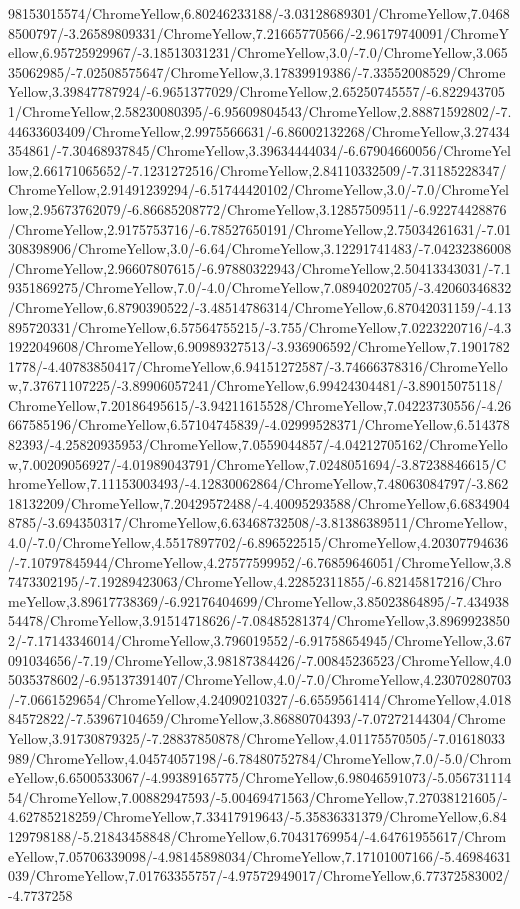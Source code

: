 {\begin{tikzternal}
98153015574/ChromeYellow,6.80246233188/-3.03128689301/ChromeYellow,7.04688500797/-3.26589809331/ChromeYellow,7.21665770566/-2.96179740091/ChromeYellow,6.95725929967/-3.18513031231/ChromeYellow,3.0/-7.0/ChromeYellow,3.06535062985/-7.02508575647/ChromeYellow,3.17839919386/-7.33552008529/ChromeYellow,3.39847787924/-6.9651377029/ChromeYellow,2.65250745557/-6.8229437051/ChromeYellow,2.58230080395/-6.95609804543/ChromeYellow,2.88871592802/-7.44633603409/ChromeYellow,2.9975566631/-6.86002132268/ChromeYellow,3.27434354861/-7.30468937845/ChromeYellow,3.39634444034/-6.67904660056/ChromeYellow,2.66171065652/-7.1231272516/ChromeYellow,2.84110332509/-7.31185228347/ChromeYellow,2.91491239294/-6.51744420102/ChromeYellow,3.0/-7.0/ChromeYellow,2.95673762079/-6.86685208772/ChromeYellow,3.12857509511/-6.92274428876/ChromeYellow,2.9175753716/-6.78527650191/ChromeYellow,2.75034261631/-7.01308398906/ChromeYellow,3.0/-6.64/ChromeYellow,3.12291741483/-7.04232386008/ChromeYellow,2.96607807615/-6.97880322943/ChromeYellow,2.50413343031/-7.19351869275/ChromeYellow,7.0/-4.0/ChromeYellow,7.08940202705/-3.42060346832/ChromeYellow,6.8790390522/-3.48514786314/ChromeYellow,6.87042031159/-4.13895720331/ChromeYellow,6.57564755215/-3.755/ChromeYellow,7.0223220716/-4.31922049608/ChromeYellow,6.90989327513/-3.936906592/ChromeYellow,7.19017821778/-4.40783850417/ChromeYellow,6.94151272587/-3.74666378316/ChromeYellow,7.37671107225/-3.89906057241/ChromeYellow,6.99424304481/-3.89015075118/ChromeYellow,7.20186495615/-3.94211615528/ChromeYellow,7.04223730556/-4.26667585196/ChromeYellow,6.57104745839/-4.02999528371/ChromeYellow,6.51437882393/-4.25820935953/ChromeYellow,7.0559044857/-4.04212705162/ChromeYellow,7.00209056927/-4.01989043791/ChromeYellow,7.0248051694/-3.87238846615/ChromeYellow,7.11153003493/-4.12830062864/ChromeYellow,7.48063084797/-3.86218132209/ChromeYellow,7.20429572488/-4.40095293588/ChromeYellow,6.68349048785/-3.694350317/ChromeYellow,6.63468732508/-3.81386389511/ChromeYellow,4.0/-7.0/ChromeYellow,4.5517897702/-6.896522515/ChromeYellow,4.20307794636/-7.10797845944/ChromeYellow,4.27577599952/-6.76859646051/ChromeYellow,3.87473302195/-7.19289423063/ChromeYellow,4.22852311855/-6.82145817216/ChromeYellow,3.89617738369/-6.92176404699/ChromeYellow,3.85023864895/-7.43493854478/ChromeYellow,3.91514718626/-7.08485281374/ChromeYellow,3.89699238502/-7.17143346014/ChromeYellow,3.796019552/-6.91758654945/ChromeYellow,3.67091034656/-7.19/ChromeYellow,3.98187384426/-7.00845236523/ChromeYellow,4.05035378602/-6.95137391407/ChromeYellow,4.0/-7.0/ChromeYellow,4.23070280703/-7.0661529654/ChromeYellow,4.24090210327/-6.6559561414/ChromeYellow,4.01884572822/-7.53967104659/ChromeYellow,3.86880704393/-7.07272144304/ChromeYellow,3.91730879325/-7.28837850878/ChromeYellow,4.01175570505/-7.01618033989/ChromeYellow,4.04574057198/-6.78480752784/ChromeYellow,7.0/-5.0/ChromeYellow,6.6500533067/-4.99389165775/ChromeYellow,6.98046591073/-5.05673111454/ChromeYellow,7.00882947593/-5.00469471563/ChromeYellow,7.27038121605/-4.62785218259/ChromeYellow,7.33417919643/-5.35836331379/ChromeYellow,6.84129798188/-5.21843458848/ChromeYellow,6.70431769954/-4.64761955617/ChromeYellow,7.05706339098/-4.98145898034/ChromeYellow,7.17101007166/-5.46984631039/ChromeYellow,7.01763355757/-4.97572949017/ChromeYellow,6.77372583002/-4.7737258
\end{tikzternal}}
